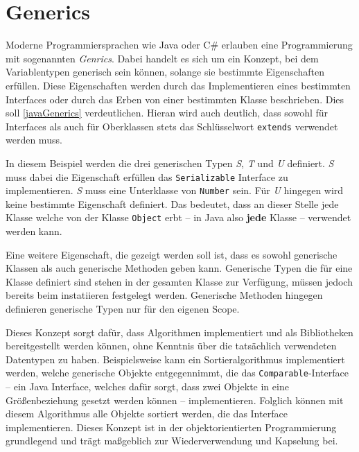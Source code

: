 \section{Generics}
Moderne Programmiersprachen wie Java oder C\# erlauben eine Programmierung mit sogenannten \textit{Genrics}. Dabei handelt es sich um ein Konzept, bei dem Variablentypen generisch sein können, solange sie bestimmte Eigenschaften erfüllen. Diese Eigenschaften werden durch das Implementieren eines bestimmten Interfaces oder durch das Erben von einer bestimmten Klasse beschrieben. Dies soll \autoref{javaGenerics} verdeutlichen. Hieran wird auch deutlich, dass sowohl für Interfaces als auch für Oberklassen stets das Schlüsselwort \texttt{extends} verwendet werden muss.


In diesem Beispiel werden die drei generischen Typen \textit{S}, \textit{T} und \textit{U} definiert. \textit{S} muss dabei die Eigenschaft erfüllen das \texttt{Serializable} Interface zu implementieren. \textit{S} muss eine Unterklasse von \texttt{Number} sein. Für \textit{U} hingegen wird keine bestimmte Eigenschaft definiert. Das bedeutet, dass an dieser Stelle jede Klasse welche von der Klasse \texttt{Object} erbt -- in Java also \textbf{jede} Klasse -- verwendet werden kann. 

Eine weitere Eigenschaft, die gezeigt werden soll ist, dass es sowohl generische Klassen als auch generische Methoden geben kann. Generische Typen die für eine Klasse definiert sind stehen in der gesamten Klasse zur Verfügung, müssen jedoch bereits beim instatiieren festgelegt werden. Generische Methoden hingegen definieren generische Typen nur für den eigenen Scope.

Dieses Konzept sorgt dafür, dass Algorithmen implementiert und als Bibliotheken bereitgestellt werden können, ohne Kenntnis über die tatsächlich verwendeten Datentypen zu haben. Beispielsweise kann ein Sortieralgorithmus implementiert werden, welche generische Objekte entgegennimmt, die das \texttt{Comparable}-Interface -- ein Java Interface, welches dafür sorgt, dass zwei Objekte in eine Größenbeziehung gesetzt werden können -- implementieren. Folglich können mit diesem Algorithmus alle Objekte sortiert werden, die das Interface implementieren. Dieses Konzept ist in der objektorientierten Programmierung grundlegend und trägt maßgeblich zur Wiederverwendung und Kapselung bei.